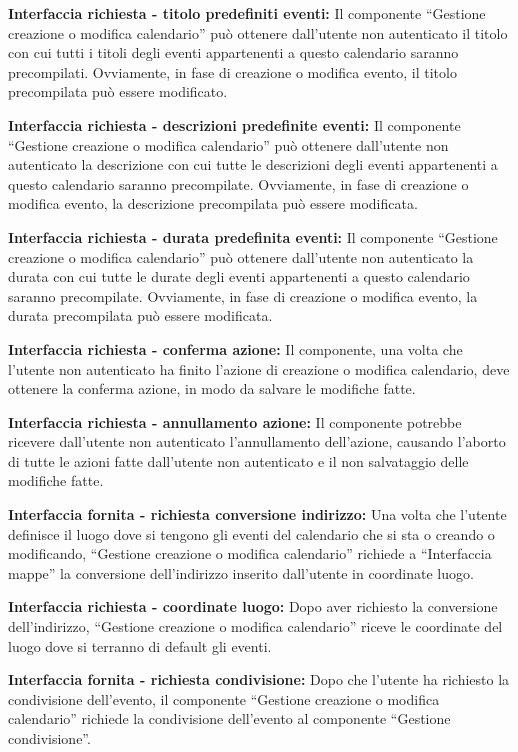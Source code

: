 \begin{listaPersonale}[DCI]{}
    \textbf{Interfaccia richiesta - titolo predefiniti eventi:} Il componente “Gestione creazione o modifica calendario” può ottenere dall'utente non autenticato il titolo con cui tutti i titoli degli eventi appartenenti a questo calendario saranno precompilati. Ovviamente, in fase di creazione o modifica evento, il titolo precompilata può essere modificato.

    \textbf{Interfaccia richiesta - descrizioni predefinite eventi:} Il componente “Gestione creazione o modifica calendario” può ottenere dall'utente non autenticato la descrizione con cui tutte le descrizioni degli eventi appartenenti a questo calendario saranno precompilate. Ovviamente, in fase di creazione o modifica evento, la descrizione precompilata può essere modificata.

    \textbf{Interfaccia richiesta - durata predefinita eventi:} Il componente “Gestione creazione o modifica calendario” può ottenere dall'utente non autenticato la durata con cui tutte le durate degli eventi appartenenti a questo calendario saranno precompilate. Ovviamente, in fase di creazione o modifica evento, la durata precompilata può essere modificata.

    \textbf{Interfaccia richiesta - conferma azione:} Il componente, una volta che l'utente non autenticato ha finito l'azione di creazione o modifica calendario,  deve ottenere la conferma azione, in modo da salvare le modifiche fatte.

    \textbf{Interfaccia richiesta - annullamento azione:} Il componente potrebbe ricevere dall'utente non autenticato l'annullamento dell'azione, causando l'aborto di tutte le azioni fatte dall'utente non autenticato e il non salvataggio delle modifiche fatte.

    \textbf{Interfaccia fornita - richiesta conversione indirizzo:} Una volta che l'utente definisce il luogo dove si tengono gli eventi del calendario che si sta o creando o modificando, “Gestione creazione o modifica calendario” richiede a “Interfaccia mappe” la conversione dell'indirizzo inserito dall'utente in coordinate luogo.

    \textbf{Interfaccia richiesta - coordinate luogo:} Dopo aver richiesto la conversione dell'indirizzo, “Gestione creazione o modifica calendario” riceve le coordinate del luogo dove si terranno di default gli eventi.

    \textbf{Interfaccia fornita - richiesta condivisione:} Dopo che l'utente ha richiesto la condivisione dell'evento, il componente “Gestione creazione o modifica calendario” richiede la condivisione dell'evento al componente “Gestione condivisione”.


\end{listaPersonale}
